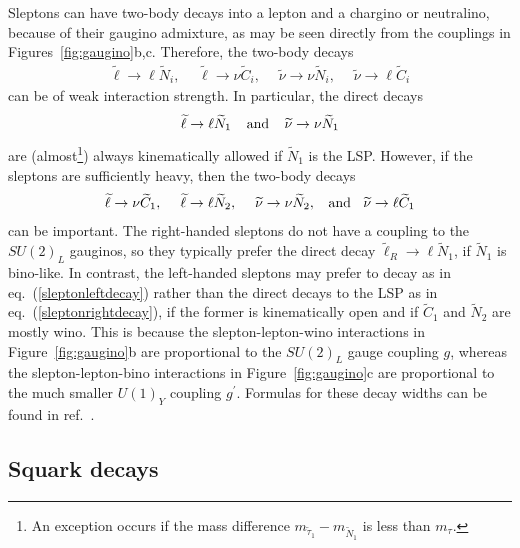 \documentclass[11pt]{article}
\def\beq{\begin{eqnarray}}
\def\eeq{\end{eqnarray}}
\def\stilde{\widetilde}
\def\NI{\stilde N_1}
\begin{document}
Sleptons can have two-body decays into a lepton and a chargino or 
neutralino, because of their gaugino admixture, as may be seen directly 
from the couplings in Figures~\ref{fig:gaugino}b,c. Therefore, the 
two-body decays
\beq
\stilde \ell \rightarrow \ell \stilde N_i,\>\>\>\>\>\,
\stilde \ell \rightarrow \nu \stilde C_i,\>\>\>\>\>\,
\stilde \nu \rightarrow \nu \stilde N_i,\>\>\>\>\>\,
\stilde \nu \rightarrow \ell \stilde C_i
\eeq
can be of weak interaction strength. In particular, the direct decays
\beq
\stilde \ell \rightarrow \ell \stilde N_1
\>\>\>\>\>{\rm and}\>\>\>\>\>
\stilde \nu \rightarrow \nu \stilde N_1
\label{sleptonrightdecay}
\eeq
are (almost\footnote{An exception occurs if the mass difference $m_{\tilde
\tau_1} - m_{\tilde N_1}$ is less than $m_{\tau}$.}) always kinematically
allowed if $\stilde N_1$ is the LSP. However, if the sleptons are
sufficiently heavy, then the two-body decays
\beq
\stilde \ell \rightarrow \nu \stilde C_{1}
,\>\>\>\>\>\,
\stilde \ell \rightarrow \ell \stilde N_{2}
,\>\>\>\>\>\,
\stilde \nu \rightarrow \nu \stilde N_{2}
,\>\>\>\>{\rm and}\>\>\>\>
\stilde \nu \rightarrow \ell \stilde C_{1}
\label{sleptonleftdecay}
\eeq
can be important. The right-handed sleptons do not have a coupling to the 
$SU(2)_L$ gauginos, so they typically prefer the direct decay $\stilde 
\ell_R \rightarrow \ell\NI$, if $\NI$ is bino-like. In contrast, the 
left-handed sleptons may prefer to decay as in 
eq.~(\ref{sleptonleftdecay}) rather than the direct decays to the LSP as 
in eq.~(\ref{sleptonrightdecay}), if the former is kinematically open and 
if $\stilde C_1$ and $\stilde N_2$ are mostly wino. This is because the 
slepton-lepton-wino interactions in Figure~\ref{fig:gaugino}b are 
proportional to the $SU(2)_L$ gauge coupling $g$, whereas the 
slepton-lepton-bino interactions in Figure~\ref{fig:gaugino}c are 
proportional to the much smaller $U(1)_Y$ coupling $g^\prime$. Formulas 
for these decay widths can be found in ref.~\cite{epprod}.

\subsection{Squark decays}\label{subsec:decays.squarks}
\setcounter{equation}{0}
\setcounter{footnote}{1}
\end{document}
